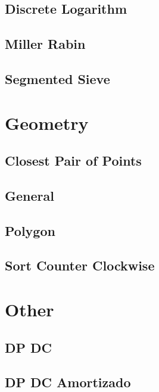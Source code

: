 \subsection{	Discrete Logarithm}
\raggedbottom
\hrulefill
\subsection{	Miller Rabin}
\raggedbottom
\hrulefill
\subsection{	Segmented Sieve}
\raggedbottom
\hrulefill

\section{Geometry}
\subsection{	Closest Pair of Points}
\raggedbottom
\hrulefill
\subsection{	General}
\raggedbottom
\hrulefill
\subsection{	Polygon}
\raggedbottom
\hrulefill
\subsection{	Sort Counter Clockwise}
\raggedbottom
\hrulefill

\section{Other}
\subsection{	DP DC}
\raggedbottom
\hrulefill
\subsection{	DP DC Amortizado}
\raggedbottom
\hrulefill
